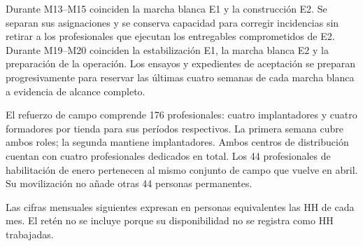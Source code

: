 \documentclass[11pt]{article}
\begin{document}
Durante M13--M15 coinciden la marcha blanca E1 y la construcción E2. Se separan sus asignaciones y se conserva capacidad para corregir incidencias sin retirar a los profesionales que ejecutan los entregables comprometidos de E2. Durante M19--M20 coinciden la estabilización E1, la marcha blanca E2 y la preparación de la operación. Los ensayos y expedientes de aceptación se preparan progresivamente para reservar las últimas cuatro semanas de cada marcha blanca a evidencia de alcance completo.

El refuerzo de campo comprende 176 profesionales: cuatro implantadores y cuatro formadores por tienda para sus períodos respectivos. La primera semana cubre ambos roles; la segunda mantiene implantadores. Ambos centros de distribución cuentan con cuatro profesionales dedicados en total. Los 44 profesionales de habilitación de enero pertenecen al mismo conjunto de campo que vuelve en abril. Su movilización no añade otras 44 personas permanentes.

Las cifras mensuales siguientes expresan en personas equivalentes las HH de cada mes. El retén no se incluye porque su disponibilidad no se registra como HH trabajadas.
\end{document}
